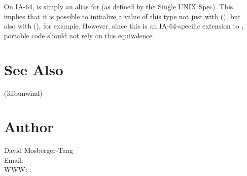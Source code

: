 \documentclass{article}
\begin{document}
On IA-64,  is simply an alias for
 (as defined by the Single UNIX Spec).  This implies
that it is possible to initialize a value of this type not just with
(), but also with (), for
example.  However, since this is an IA-64-specific extension to
, portable code should not rely on this equivalence.


\section{See Also}

(3libunwind)

\section{Author}

\noindent
David Mosberger-Tang\\
Email: \\
WWW: .
\LatexManEnd
\end{document}
